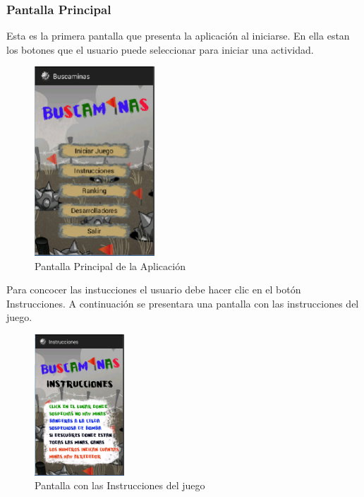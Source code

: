 \documentclass[11pt]{article} %
\begin{document}
\subsubsection{\textbf{Pantalla Principal}}
Esta es la primera pantalla que presenta la aplicaci\' on al iniciarse. En ella estan los botones que el usuario puede seleccionar para iniciar una actividad.
\begin{center}

	\begin{figure}[h!]
  		\centering
    		\includegraphics[width=0.4\textwidth]{imagenes/PantallaPrincipal.PNG}
  		\caption{Pantalla Principal de la Aplicaci\' on}
		\label{fig:pantallaprincipal}
	\end{figure}
\end{center}

Para concocer las instucciones el usuario debe hacer clic en el bot\'on Instrucciones. A continuaci\'on se presentara una pantalla con las instrucciones del juego.
\begin{center}

	\begin{figure}[h!]
  		\centering
    		\includegraphics[width=0.3\textwidth]{imagenes/Instrucciones.PNG}
  		\caption{Pantalla con las Instrucciones del juego}
		\label{fig:instrucciones}
	\end{figure}
\end{center}
\end{document}
